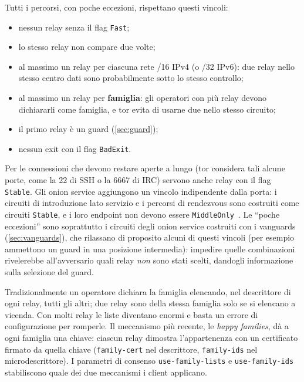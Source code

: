 Tutti i percorsi, con poche eccezioni, rispettano questi vincoli:
\begin{itemize}
  \item nessun relay senza il flag \texttt{Fast};
  \item lo stesso relay non compare due volte;
  \item al massimo un relay per ciascuna rete /16 IPv4 (o /32 IPv6): due relay nello stesso centro dati sono probabilmente sotto lo stesso controllo;
  \item al massimo un relay per \textbf{famiglia}: gli operatori con più relay devono dichiararli come famiglia, e tor evita di usarne due nello stesso circuito;
  \item il primo relay è un guard (\cref{sec:guard});
  \item nessun exit con il flag \texttt{BadExit}.
\end{itemize}
Per le connessioni che devono restare aperte a lungo (tor considera tali alcune porte, come la 22 di SSH o la 6667 di IRC) servono anche relay con il flag \texttt{Stable}. Gli onion service aggiungono un vincolo indipendente dalla porta: i circuiti di introduzione lato servizio e i percorsi di rendezvous sono costruiti come circuiti \texttt{Stable}, e i loro endpoint non devono essere \texttt{MiddleOnly}~. Le \enquote{poche eccezioni} sono soprattutto i circuiti degli onion service costruiti con i vanguards (\cref{sec:vanguards}), che rilassano di proposito alcuni di questi vincoli (per esempio ammettono un guard in una posizione intermedia): impedire quelle combinazioni rivelerebbe all'avversario quali relay \emph{non} sono stati scelti, dandogli informazione sulla selezione del guard.

\begin{approfondimento}
Tradizionalmente un operatore dichiara la famiglia elencando, nel descrittore di ogni relay, tutti gli altri; due relay sono della stessa famiglia solo se si elencano a vicenda. Con molti relay le liste diventano enormi e basta un errore di configurazione per romperle. Il meccanismo più recente, le \emph{happy families}, dà a ogni famiglia una chiave: ciascun relay dimostra l'appartenenza con un certificato firmato da quella chiave (\texttt{family-cert} nel descrittore, \texttt{family-ids} nel microdescrittore). I parametri di consenso \texttt{use-family-lists} e \texttt{use-family-ids} stabiliscono quale dei due meccanismi i client applicano.
\end{approfondimento}

